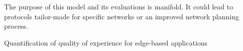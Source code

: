 The purpose of this model and its evaluations is manifold. It could lead to protocols tailor-made for specific networks or an improved network planning process.









Quantification of quality of experience for edge-based applications\cite{hossfeld2007quantification}

  


